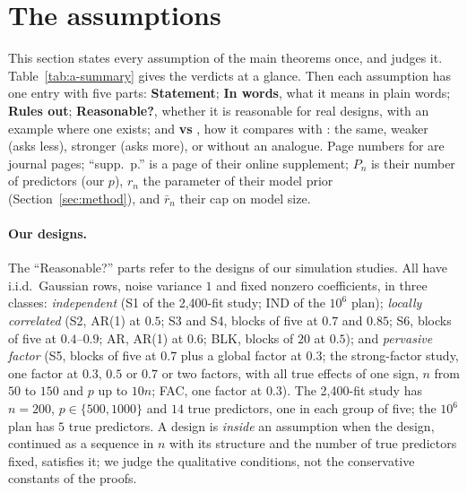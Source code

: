 \section{The assumptions}\label{sec:assumptions}\label{sec:standing}

This section states every assumption of the main theorems once, and judges it. Table~\ref{tab:a-summary} gives the
verdicts at a glance. Then each assumption has one entry with five parts: \textbf{Statement}; \textbf{In words}, what it
means in plain words; \textbf{Rules out}; \textbf{Reasonable?}, whether it is reasonable for real designs, with an example
where one exists; and \textbf{vs \SL}, how it compares with \citet{SongLiang2015}: the same, weaker (asks less), stronger
(asks more), or without an analogue. Page numbers for \SL{} are journal pages; ``supp.\ p.'' is a page of their
online supplement; $P_n$ is their number of predictors (our $p$), $r_n$ the parameter of their model prior
(Section~\ref{sec:method}), and $\bar r_n$ their cap on model size.

\paragraph{Our designs.} The ``Reasonable?'' parts refer to the designs of our simulation studies. All have i.i.d.\ Gaussian rows, noise
variance $1$ and fixed nonzero coefficients, in three classes: \emph{independent} (S1 of the 2,400-fit study; IND of the
$10^6$ plan); \emph{locally correlated} (S2, AR(1) at $0.5$; S3 and S4, blocks of five at $0.7$ and $0.85$; S6, blocks of
five at $0.4$--$0.9$; AR, AR(1) at $0.6$; BLK, blocks of $20$ at $0.5$); and \emph{pervasive factor} (S5, blocks of five
at $0.7$ plus a global factor at $0.3$; the strong-factor study, one factor at $0.3$, $0.5$ or $0.7$ or two factors, with
all true effects of one sign, $n$ from $50$ to $150$ and $p$ up to $10n$; FAC, one factor at $0.3$). The 2,400-fit study has
$n=200$, $p\in\{500,1000\}$ and $14$ true predictors, one in each group of five; the $10^6$ plan has $5$ true predictors.
A design is \emph{inside} an assumption when the design, continued as a sequence in $n$ with its structure and the number
of true predictors fixed, satisfies it; we judge the qualitative conditions, not the conservative constants of the proofs.

